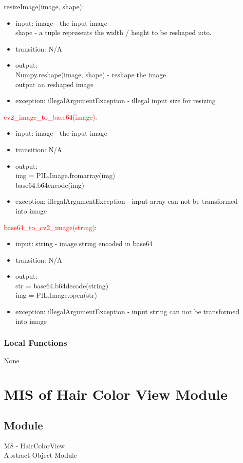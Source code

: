 \documentclass[12pt, titlepage]{article}
\begin{document}
\noindent resizeImage(image, shape):
\begin{itemize}
\item input: image - the input image \\
shape - a tuple represents the width / height to be reshaped into.
\item transition: N/A
\item output: \\
Numpy.reshape(image, shape) - reshape the image \\
output an reshaped image 
\item exception: illegalArgumentException - illegal input size for resizing
\end{itemize}
\color{red}
\noindent \textcolor{red}{cv2\_image\_to\_base64(image)}:
\begin{itemize}
\item input: image - the input image 
\item transition: N/A
\item output: \\
img = PIL.Image.fromarray(img) \\
base64.b64encode(img)
\item exception: illegalArgumentException - input array can not be transformed into image
\end{itemize}

\noindent \textcolor{red}{base64\_to\_cv2\_image(string)}:
\begin{itemize}
\item input: string - image string encoded in base64
\item transition: N/A
\item output: \\
str = base64.b64decode(string) \\ 
img = PIL.Image.open(str) \\
\item exception: illegalArgumentException - input string can not be transformed into image
\end{itemize}
\color{black}
\subsubsection{Local Functions}
None


\newpage
\section{MIS of Hair Color View Module} \label{Module} 
\subsection{Module}
M8 - HairColorView\\
Abstract Object Module
\end{document}
